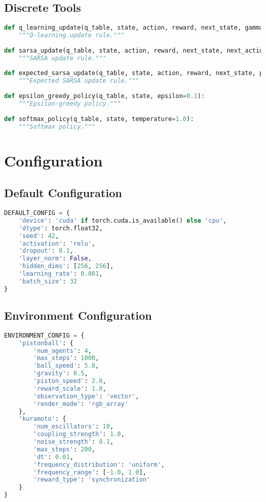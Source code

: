 \subsection{Discrete Tools}

\begin{lstlisting}[language=python]
def q_learning_update(q_table, state, action, reward, next_state, gamma=0.99, alpha=0.1):
    """Q-learning update rule."""
    
def sarsa_update(q_table, state, action, reward, next_state, next_action, gamma=0.99, alpha=0.1):
    """SARSA update rule."""
    
def expected_sarsa_update(q_table, state, action, reward, next_state, policy_table, gamma=0.99, alpha=0.1):
    """Expected SARSA update rule."""
    
def epsilon_greedy_policy(q_table, state, epsilon=0.1):
    """Epsilon-greedy policy."""
    
def softmax_policy(q_table, state, temperature=1.0):
    """Softmax policy."""
\end{lstlisting}

\section{Configuration}

\subsection{Default Configuration}

\begin{lstlisting}[language=python]
DEFAULT_CONFIG = {
    'device': 'cuda' if torch.cuda.is_available() else 'cpu',
    'dtype': torch.float32,
    'seed': 42,
    'activation': 'relu',
    'dropout': 0.1,
    'layer_norm': False,
    'hidden_dims': [256, 256],
    'learning_rate': 0.001,
    'batch_size': 32
}
\end{lstlisting}

\subsection{Environment Configuration}

\begin{lstlisting}[language=python]
ENVIRONMENT_CONFIG = {
    'pistonball': {
        'num_agents': 4,
        'max_steps': 1000,
        'ball_speed': 5.0,
        'gravity': 0.5,
        'piston_speed': 2.0,
        'reward_scale': 1.0,
        'observation_type': 'vector',
        'render_mode': 'rgb_array'
    },
    'kuramoto': {
        'num_oscillators': 10,
        'coupling_strength': 1.0,
        'noise_strength': 0.1,
        'max_steps': 200,
        'dt': 0.01,
        'frequency_distribution': 'uniform',
        'frequency_range': [-1.0, 1.0],
        'reward_type': 'synchronization'
    }
}
\end{lstlisting} 